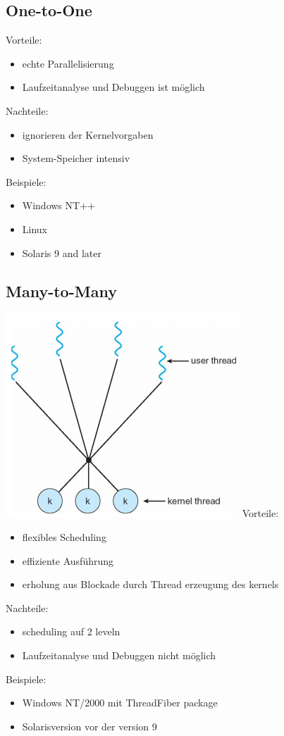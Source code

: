 \documentclass[a4paper]{scrreprt}
\begin{document}
	\subsection{One-to-One}
		Vorteile:
		\begin{itemize}
			\item echte Parallelisierung
			\item Laufzeitanalyse und Debuggen ist möglich
		\end{itemize}
		Nachteile:
		\begin{itemize}
			\item ignorieren der Kernelvorgaben
			\item System-Speicher intensiv
		\end{itemize}
		Beispiele:
		\begin{itemize}
			\item Windows NT++
			\item Linux
			\item Solaris 9 and later
		\end{itemize}
		
	\subsection{Many-to-Many}
		\includegraphics[scale = 0.6]{graphics/many_to_many.png}
		Vorteile:
		\begin{itemize}
			\item flexibles Scheduling
			\item effiziente Ausführung
			\item erholung aus Blockade durch Thread erzeugung des kernels
		\end{itemize}
		Nachteile:
		\begin{itemize}
			\item scheduling auf 2 leveln
			\item Laufzeitanalyse und Debuggen nicht möglich
		\end{itemize}
		Beispiele:
		\begin{itemize}
			\item Windows NT/2000 mit ThreadFiber package
			\item Solarisversion vor der version 9
		\end{itemize}
			
\end{document}
